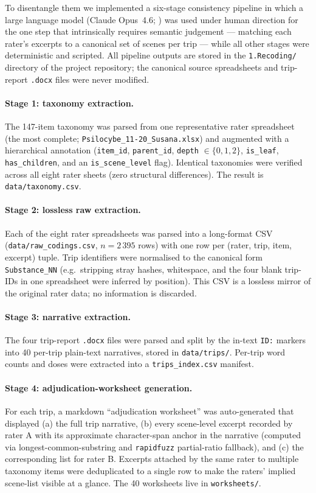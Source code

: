 To disentangle them we implemented a six-stage consistency pipeline in which a large language model (Claude Opus~4.6; \citealt{anthropic2024}) was used under human direction for the one step that intrinsically requires semantic judgement --- matching each rater's excerpts to a canonical set of scenes per trip --- while all other stages were deterministic and scripted. All pipeline outputs are stored in the \texttt{1.Recoding/} directory of the project repository; the canonical source spreadsheets and trip-report \texttt{.docx} files were never modified.

\paragraph{Stage 1: taxonomy extraction.} The 147-item taxonomy was parsed from one representative rater spreadsheet (the most complete; \texttt{Psilocybe\_11-20\_Susana.xlsx}) and augmented with a hierarchical annotation (\texttt{item\_id}, \texttt{parent\_id}, \texttt{depth} $\in\{0,1,2\}$, \texttt{is\_leaf}, \texttt{has\_children}, and an \texttt{is\_scene\_level} flag). Identical taxonomies were verified across all eight rater sheets (zero structural differences). The result is \texttt{data/taxonomy.csv}.

\paragraph{Stage 2: lossless raw extraction.} Each of the eight rater spreadsheets was parsed into a long-format CSV (\texttt{data/raw\_codings.csv}, $n=2\,395$ rows) with one row per (rater, trip, item, excerpt) tuple. Trip identifiers were normalised to the canonical form \texttt{Substance\_NN} (e.g.\ stripping stray hashes, whitespace, and the four blank trip-IDs in one spreadsheet were inferred by position). This CSV is a lossless mirror of the original rater data; no information is discarded.

\paragraph{Stage 3: narrative extraction.} The four trip-report \texttt{.docx} files were parsed and split by the in-text \texttt{ID:} markers into 40 per-trip plain-text narratives, stored in \texttt{data/trips/}. Per-trip word counts and doses were extracted into a \texttt{trips\_index.csv} manifest.

\paragraph{Stage 4: adjudication-worksheet generation.} For each trip, a markdown ``adjudication worksheet'' was auto-generated that displayed (a) the full trip narrative, (b) every scene-level excerpt recorded by rater A with its approximate character-span anchor in the narrative (computed via longest-common-substring and \texttt{rapidfuzz} partial-ratio fallback), and (c) the corresponding list for rater B. Excerpts attached by the same rater to multiple taxonomy items were deduplicated to a single row to make the raters' implied scene-list visible at a glance. The 40 worksheets live in \texttt{worksheets/}.

